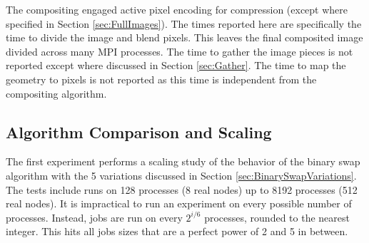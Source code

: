\documentclass{vgtc}                          %
\newcommand*{\textalgorithm}[1]{\textsf{#1}\xspace}
\newcommand{\binaryswap}{\textalgorithm{binary swap}}
\begin{document}
The compositing engaged active pixel encoding for compression (except where specified in Section \ref{sec:FullImages}).
The times reported here are specifically the time to divide the image and blend pixels.
This leaves the final composited image divided across many MPI processes.
The time to gather the image pieces is not reported except where discussed in Section \ref{sec:Gather}.
The time to map the geometry to pixels is not reported as this time is independent from the compositing algorithm.

\subsection{Algorithm Comparison and Scaling}
\label{sec:Scaling}

The first experiment performs a scaling study of the behavior of the \binaryswap algorithm with the 5 variations discussed in Section \ref{sec:BinarySwapVariations}.
The tests include runs on 128 processes (8 real nodes) up to 8192 processes (512 real nodes).
It is impractical to run an experiment on every possible number of processes.
Instead, jobs are run on every $2^{i/6}$ processes, rounded to the nearest integer.
This hits all jobs sizes that are a perfect power of 2 and 5 in between.
\end{document}
